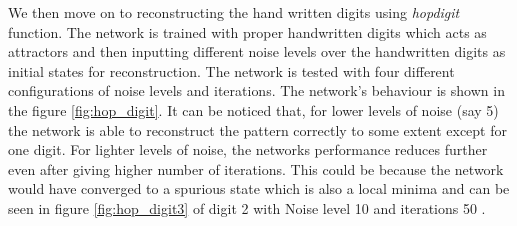 We then move on to reconstructing the hand written digits using \textit{hopdigit} function. The network is trained with proper handwritten digits which acts as attractors and then inputting different noise levels over the handwritten digits as initial states for reconstruction. The network is tested with four different configurations of noise levels and iterations. The network's behaviour is shown in the figure \ref{fig:hop_digit}. It can be noticed that, for lower levels of noise (say 5) the network is able to reconstruct the pattern correctly to some extent except for one digit. For lighter levels of noise, the networks performance reduces further even after giving higher number of iterations. This could be because the network would have converged to a spurious state which is also a local minima and can be seen in figure \ref{fig:hop_digit3} of digit 2 with Noise level 10 and iterations 50 .\\
